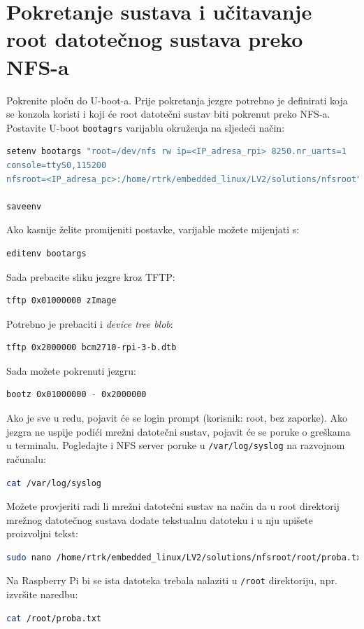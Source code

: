 \documentclass[11pt]{article}
\begin{document}
\section{Pokretanje sustava i učitavanje root datotečnog sustava preko NFS-a}
Pokrenite ploču do U-boot-a. Prije pokretanja jezgre potrebno je definirati
 koja se konzola koristi i koji će root datotečni sustav biti pokrenut preko
 NFS-a. Postavite U-boot \texttt{bootagrs} varijablu okruženja na sljedeći
 način:
\begin{lstlisting}[language=bash]
setenv bootargs "root=/dev/nfs rw ip=<IP_adresa_rpi> 8250.nr_uarts=1
console=ttyS0,115200
nfsroot=<IP_adresa_pc>:/home/rtrk/embedded_linux/LV2/solutions/nfsroot"

saveenv
\end{lstlisting}
Ako kasnije želite promijeniti postavke, varijable možete mijenjati s:
\begin{lstlisting}[language=bash]
editenv bootargs
\end{lstlisting}
Sada prebacite sliku jezgre kroz TFTP:
\begin{lstlisting}[language=bash]
tftp 0x01000000 zImage
\end{lstlisting}
Potrebno je prebaciti i \textit{device tree blob}:
\begin{lstlisting}[language=bash]
tftp 0x2000000 bcm2710-rpi-3-b.dtb
\end{lstlisting}
Sada možete pokrenuti jezgru:
\begin{lstlisting}[language=bash]
bootz 0x01000000 - 0x2000000
\end{lstlisting}
Ako je sve u redu, pojavit će se login prompt (korisnik: root, bez zaporke).
 Ako jezgra ne uspije podići mrežni datotečni sustav, pojavit će se poruke o
 greškama u terminalu. Pogledajte i NFS server poruke u \texttt{/var/log/syslog}
 na razvojnom računalu:
\begin{lstlisting}[language=bash]
cat /var/log/syslog
\end{lstlisting}
Možete provjeriti radi li mrežni datotečni sustav na način da u root direktorij
 mrežnog datotečnog sustava dodate tekstualnu datoteku i u nju upišete
 proizvoljni tekst:
\begin{lstlisting}[language=bash]
sudo nano /home/rtrk/embedded_linux/LV2/solutions/nfsroot/root/proba.txt
\end{lstlisting}
Na Raspberry Pi bi se ista datoteka trebala nalaziti u \texttt{/root}
 direktoriju, npr. izvršite naredbu:
\begin{lstlisting}[language=bash]
cat /root/proba.txt
\end{lstlisting}
\end{document}
